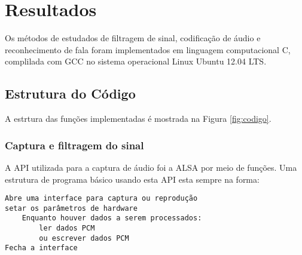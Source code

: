 \chapter{Resultados}
\thispagestyle{plain}
\quad Os métodos de estudados de filtragem de sinal, codificação de áudio e reconhecimento de fala foram implementados em linguagem computacional C, complilada  com GCC no sistema operacional Linux Ubuntu 12.04 LTS.

\section{Estrutura do Código}

\quad A estrtura das funções implementadas é mostrada na Figura \ref{fig:codigo}. 

\subsection{Captura e filtragem do sinal}

\quad A API utilizada para a captura de áudio foi a ALSA por meio de funções. Uma estrutura de programa básico usando esta API esta sempre na forma:

\begin{verbatim}
Abre uma interface para captura ou reprodução
setar os parâmetros de hardware
	Enquanto houver dados a serem processados:
		ler dados PCM
		ou escrever dados PCM
Fecha a interface
\end{verbatim}
